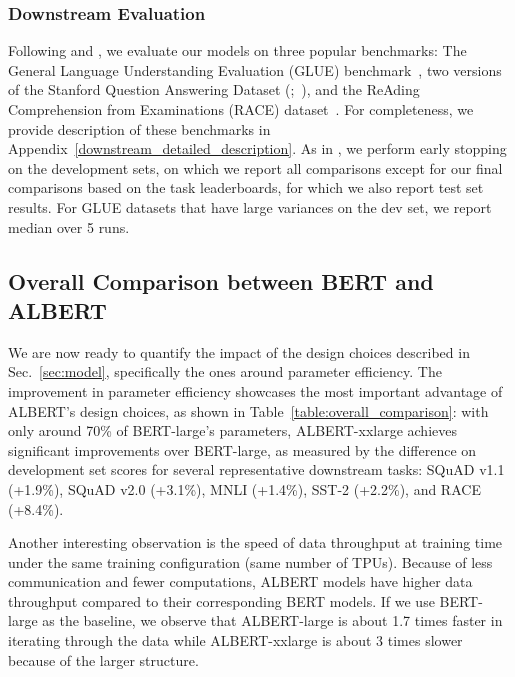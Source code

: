 \subsubsection{Downstream Evaluation}
Following \cite{yang2019xlnet} and \cite{liu2019roberta}, we evaluate our models on three popular benchmarks: The General Language Understanding Evaluation (GLUE) benchmark~\citep{wang-etal-2018-glue}, two versions of the Stanford Question Answering Dataset (\squad;~\citealp{rajpurkar-etal-2016-squad,rajpurkar-etal-2018-know}), and the ReAding Comprehension from Examinations  (RACE) dataset~\citep{lai2017race}. 
For completeness, we provide description of these benchmarks in Appendix~\ref{downstream_detailed_description}.
As in \citep{liu2019roberta}, we perform early stopping on the development sets, on which we report all comparisons except for our final comparisons based on the task leaderboards, for which we also report test set results. For GLUE datasets that have large variances on the dev set, we report median over 5 runs.  


\subsection{Overall Comparison between BERT and ALBERT}
We are now ready to quantify the impact of the design choices described in Sec.~\ref{sec:model}, specifically the ones around parameter efficiency.
The improvement in parameter efficiency showcases the most important advantage of ALBERT's design choices, as shown in Table~\ref{table:overall_comparison}: with only around 70\% of BERT-large's parameters, ALBERT-xxlarge achieves significant improvements over BERT-large, as measured by the difference on development set scores for several representative downstream tasks:
SQuAD v1.1 (+1.9\%), SQuAD v2.0 (+3.1\%), MNLI (+1.4\%), SST-2 (+2.2\%), and RACE (+8.4\%).


Another interesting observation is the speed of data throughput at training time under the same training configuration (same number of TPUs). 
Because of less communication and fewer computations, ALBERT models have higher data throughput compared to their corresponding BERT models.
If we use BERT-large as the baseline, we observe that ALBERT-large is about 1.7 times faster in iterating through the data while ALBERT-xxlarge is about 3 times slower because of the larger structure. 


